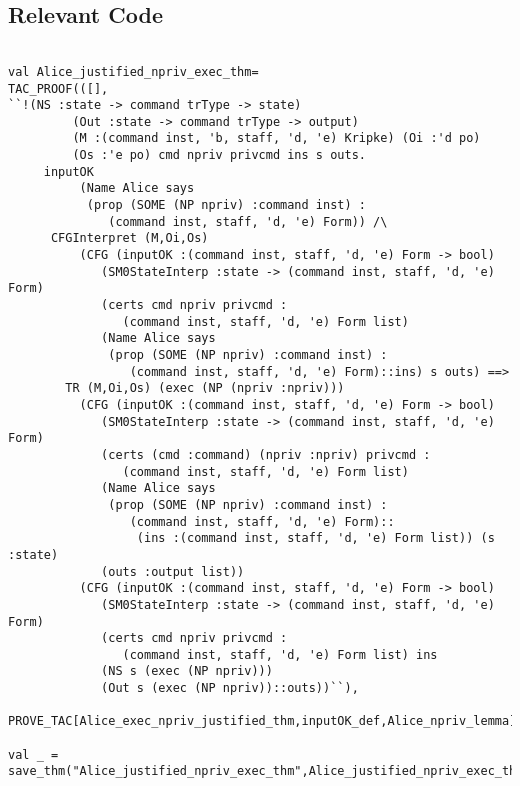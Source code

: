 \documentclass{report}
\begin{document}
\subsection{Relevant Code}
\label{rel-code-4}
\begin{lstlisting}[frame=TBlr]

val Alice_justified_npriv_exec_thm=
TAC_PROOF(([],
``!(NS :state -> command trType -> state)
         (Out :state -> command trType -> output)
         (M :(command inst, 'b, staff, 'd, 'e) Kripke) (Oi :'d po)
         (Os :'e po) cmd npriv privcmd ins s outs.
	 inputOK
          (Name Alice says
           (prop (SOME (NP npriv) :command inst) :
              (command inst, staff, 'd, 'e) Form)) /\
	  CFGInterpret (M,Oi,Os)
          (CFG (inputOK :(command inst, staff, 'd, 'e) Form -> bool)
             (SM0StateInterp :state -> (command inst, staff, 'd, 'e) Form)
             (certs cmd npriv privcmd :
                (command inst, staff, 'd, 'e) Form list)
             (Name Alice says
              (prop (SOME (NP npriv) :command inst) :
                 (command inst, staff, 'd, 'e) Form)::ins) s outs) ==>
        TR (M,Oi,Os) (exec (NP (npriv :npriv)))
          (CFG (inputOK :(command inst, staff, 'd, 'e) Form -> bool)
             (SM0StateInterp :state -> (command inst, staff, 'd, 'e) Form)
             (certs (cmd :command) (npriv :npriv) privcmd :
                (command inst, staff, 'd, 'e) Form list)
             (Name Alice says
              (prop (SOME (NP npriv) :command inst) :
                 (command inst, staff, 'd, 'e) Form)::
                  (ins :(command inst, staff, 'd, 'e) Form list)) (s :state)
             (outs :output list))
          (CFG (inputOK :(command inst, staff, 'd, 'e) Form -> bool)
             (SM0StateInterp :state -> (command inst, staff, 'd, 'e) Form)
             (certs cmd npriv privcmd :
                (command inst, staff, 'd, 'e) Form list) ins
             (NS s (exec (NP npriv)))
             (Out s (exec (NP npriv))::outs))``),
	     PROVE_TAC[Alice_exec_npriv_justified_thm,inputOK_def,Alice_npriv_lemma])

val _ = save_thm("Alice_justified_npriv_exec_thm",Alice_justified_npriv_exec_thm)


\end{lstlisting}
\end{document}

